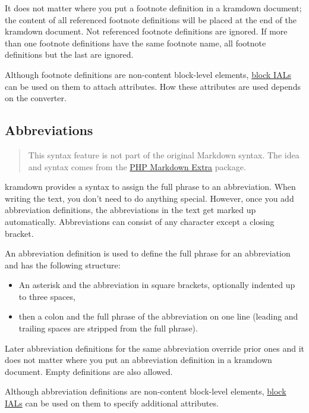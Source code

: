 \documentclass[a4paper]{article}
\begin{document}
It does not matter where you put a footnote definition in a kramdown
document; the content of all referenced footnote definitions will be
placed at the end of the kramdown document. Not referenced footnote
definitions are ignored. If more than one footnote definitions have the
same footnote name, all footnote definitions but the last are ignored.

Although footnote definitions are non-content block-level elements,
\protect\hyperlink{block-ials}{block IALs} can be used on them to attach
attributes. How these attributes are used depends on the converter.

\hypertarget{abbreviations}{\subsection{Abbreviations}\label{abbreviations}}

\begin{quote}
This syntax feature is not part of the original Markdown syntax. The
idea and syntax comes from the
\href{http://michelf.com/projects/php-markdown/extra/}{PHP Markdown
Extra} package.
\end{quote}

kramdown provides a syntax to assign the full phrase to an abbreviation.
When writing the text, you don't need to do anything special. However,
once you add abbreviation definitions, the abbreviations in the text get
marked up automatically. Abbreviations can consist of any character
except a closing bracket.

An abbreviation definition is used to define the full phrase for an
abbreviation and has the following structure:

\begin{itemize}
\item
  An asterisk and the abbreviation in square brackets, optionally
  indented up to three spaces,
\item
  then a colon and the full phrase of the abbreviation on one line
  (leading and trailing spaces are stripped from the full phrase).
\end{itemize}

Later abbreviation definitions for the same abbreviation override prior
ones and it does not matter where you put an abbreviation definition in
a kramdown document. Empty definitions are also allowed.

Although abbreviation definitions are non-content block-level elements,
\protect\hyperlink{block-ials}{block IALs} can be used on them to
specify additional attributes.
\end{document}

